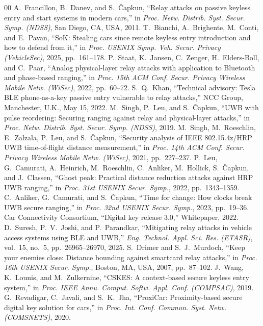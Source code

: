 \documentclass{ieeeaccess}
\begin{document}
\begin{thebibliography}{00}
 A.~Francillon, B.~Danev, and S.~\v{C}apkun, ``Relay attacks on passive keyless entry and start systems in modern cars,'' in \emph{Proc. Netw. Distrib. Syst. Secur. Symp. (NDSS)}, San Diego, CA, USA, 2011.
 T.~Bianchi, A.~Brighente, M.~Conti, and E.~Pavan, ``SoK: Stealing cars since remote keyless entry introduction and how to defend from it,'' in \emph{Proc. USENIX Symp. Veh. Secur. Privacy (VehicleSec)}, 2025, pp.~161--178.
 P.~Staat, K.~Jansen, C.~Zenger, H.~Elders-Boll, and C.~Paar, ``Analog physical-layer relay attacks with application to Bluetooth and phase-based ranging,'' in \emph{Proc. 15th ACM Conf. Secur. Privacy Wireless Mobile Netw. (WiSec)}, 2022, pp.~60--72.
 S.~Q.~Khan, ``Technical advisory: Tesla BLE phone-as-a-key passive entry vulnerable to relay attacks,'' NCC Group, Manchester, U.K., May 15, 2022.
 M.~Singh, P.~Leu, and S.~\v{C}apkun, ``UWB with pulse reordering: Securing ranging against relay and physical-layer attacks,'' in \emph{Proc. Netw. Distrib. Syst. Secur. Symp. (NDSS)}, 2019.
 M.~Singh, M.~Roeschlin, E.~Zalzala, P.~Leu, and S.~\v{C}apkun, ``Security analysis of IEEE 802.15.4z/HRP UWB time-of-flight distance measurement,'' in \emph{Proc. 14th ACM Conf. Secur. Privacy Wireless Mobile Netw. (WiSec)}, 2021, pp.~227--237.
 P.~Leu, G.~Camurati, A.~Heinrich, M.~Roeschlin, C.~Anliker, M.~Hollick, S.~\v{C}apkun, and J.~Classen, ``Ghost peak: Practical distance reduction attacks against HRP UWB ranging,'' in \emph{Proc. 31st USENIX Secur. Symp.}, 2022, pp.~1343--1359.
 C.~Anliker, G.~Camurati, and S.~\v{C}apkun, ``Time for change: How clocks break UWB secure ranging,'' in \emph{Proc. 32nd USENIX Secur. Symp.}, 2023, pp.~19--36.
 Car Connectivity Consortium, ``Digital key release 3.0,'' Whitepaper, 2022.
 D.~Suresh, P.~V.~Joshi, and P.~Parandkar, ``Mitigating relay attacks in vehicle access systems using BLE and UWB,'' \emph{Eng. Technol. Appl. Sci. Res. (ETASR)}, vol.~15, no.~5, pp.~26965--26970, 2025.
 S.~Drimer and S.~J.~Murdoch, ``Keep your enemies close: Distance bounding against smartcard relay attacks,'' in \emph{Proc. 16th USENIX Secur. Symp.}, Boston, MA, USA, 2007, pp.~87--102.
 J.~Wang, K.~Lounis, and M.~Zulkernine, ``CSKES: A context-based secure keyless entry system,'' in \emph{Proc. IEEE Annu. Comput. Softw. Appl. Conf. (COMPSAC)}, 2019.
 G.~Revadigar, C.~Javali, and S.~K.~Jha, ``ProxiCar: Proximity-based secure digital key solution for cars,'' in \emph{Proc. Int. Conf. Commun. Syst. Netw. (COMSNETS)}, 2020.

\end{thebibliography}
\end{document}

